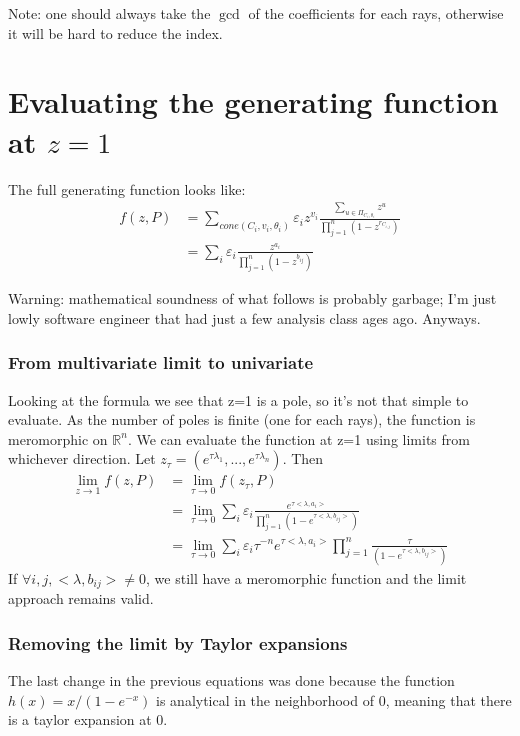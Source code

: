 \documentclass[14pt]{article}
\newcommand{\R}{\mathbb{R}}
\begin{document}
Note: one should always take the $\gcd$ of the coefficients for each rays, otherwise it will be hard to reduce the index.



\section*{Evaluating the generating function at $z=1$}

The full generating function looks like:
\begin{align*}
  f(z,P) &= \sum_{cone(C_i, v_i, \theta_i)} \varepsilon_i z^{v_i} \frac {\sum_{u \in \Pi_{C_i,\theta_i}} z^u}{\prod_{j=1}^n (1 - z^{r_{C_{i,j}}})} \\ 
  &= \sum_i \varepsilon_i \frac {z^{a_i}} {\prod_{j=1}^n (1 - z^{b_{ij}})}
\end{align*}


Warning: mathematical soundness of what follows is probably garbage; I'm just lowly software engineer that had just a few analysis class ages ago. Anyways.


\subsubsection*{From multivariate limit to univariate}
Looking at the formula we see that z=1 is a pole, so it's not that simple to evaluate. As the number of poles is finite (one for each rays), the function is meromorphic on $\R^n$.
We can evaluate the function at z=1 using limits from whichever direction.
Let $z_\tau=(e^{\tau \lambda_1}, ..., e^{\tau \lambda_n})$.
Then
\begin{align*}
  \lim_{z \to 1} f(z,P) &= \lim_{\tau \to 0} f(z_\tau, P) \\
  &= \lim_{\tau \to 0}\sum_i \varepsilon_i \frac {e^{\tau <\lambda, a_i>}} {\prod_{j=1}^n \left(1 - e^{\tau <\lambda, b_{ij}>}\right)} \\ 
  &= \lim_{\tau \to 0}\sum_i \varepsilon_i \tau ^{-n} e^{\tau <\lambda, a_i>}\prod_{j=1}^n \frac{\tau}{\left(1 - e^{\tau <\lambda, b_{ij}>}\right)}
\end{align*}
If $\forall i,j, <\lambda, b_{ij}> \neq 0$, we still have a meromorphic function and the limit approach remains valid.

\subsubsection*{Removing the limit by Taylor expansions}
The last change in the previous equations was done because the function $h(x) = x / (1 - e^{-x})$ is analytical in the neighborhood of 0, meaning that there is a taylor expansion at 0.
\end{document}
